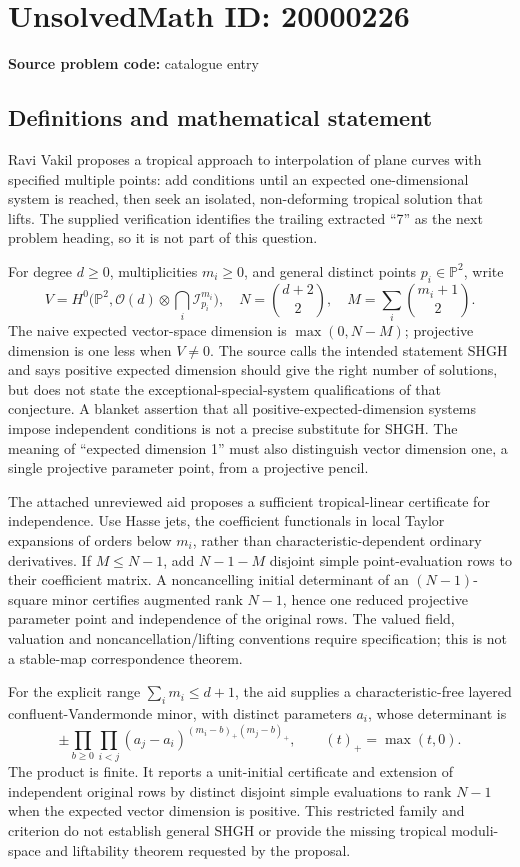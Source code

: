 \documentclass[11pt]{article}
\newcommand{\PP}{\mathbb{P}}
\begin{document}
\section*{UnsolvedMath ID: 20000226}
\textbf{Source problem code:} catalogue entry
\subsection{Definitions and mathematical statement}
Ravi Vakil proposes a tropical approach to interpolation of plane curves with specified multiple points: add conditions until an expected one-dimensional system is reached, then seek an isolated, non-deforming tropical solution that lifts. The supplied verification identifies the trailing extracted ``7'' as the next problem heading, so it is not part of this question.

For degree $d\ge0$, multiplicities $m_i\ge0$, and general distinct points $p_i\in\PP^2$, write
\[
V=H^0\bigl(\PP^2,\mathcal O(d)\otimes\bigcap_i\mathcal I_{p_i}^{m_i}\bigr),\quad
N=\binom{d+2}{2},\quad M=\sum_i\binom{m_i+1}{2}.
\]
The naive expected vector-space dimension is $\max(0,N-M)$; projective dimension is one less when $V\ne0$. The source calls the intended statement SHGH and says positive expected dimension should give the right number of solutions, but does not state the exceptional-special-system qualifications of that conjecture. A blanket assertion that all positive-expected-dimension systems impose independent conditions is not a precise substitute for SHGH. The meaning of ``expected dimension 1'' must also distinguish vector dimension one, a single projective parameter point, from a projective pencil.

The attached unreviewed aid proposes a sufficient tropical-linear certificate for independence. Use Hasse jets, the coefficient functionals in local Taylor expansions of orders below $m_i$, rather than characteristic-dependent ordinary derivatives. If $M\le N-1$, add $N-1-M$ disjoint simple point-evaluation rows to their coefficient matrix. A noncancelling initial determinant of an $(N-1)$-square minor certifies augmented rank $N-1$, hence one reduced projective parameter point and independence of the original rows. The valued field, valuation and noncancellation/lifting conventions require specification; this is not a stable-map correspondence theorem.

For the explicit range $\sum_i m_i\le d+1$, the aid supplies a characteristic-free layered confluent-Vandermonde minor, with distinct parameters $a_i$, whose determinant is
\[
\pm\prod_{b\ge0}\prod_{i<j}(a_j-a_i)^{(m_i-b)_+(m_j-b)_+},\qquad (t)_+=\max(t,0).
\]
The product is finite. It reports a unit-initial certificate and extension of independent original rows by distinct disjoint simple evaluations to rank $N-1$ when the expected vector dimension is positive. This restricted family and criterion do not establish general SHGH or provide the missing tropical moduli-space and liftability theorem requested by the proposal.
\end{document}
